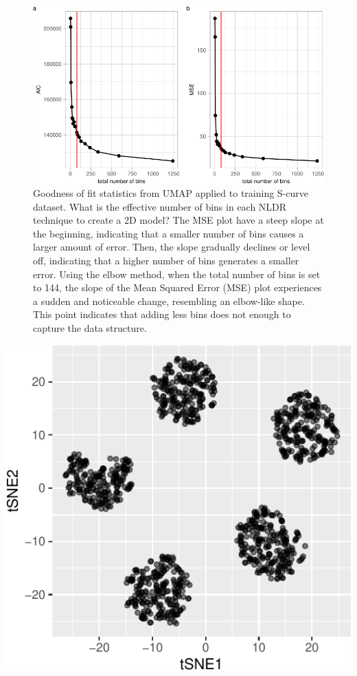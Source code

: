 \documentclass[
  12pt]{article}
\begin{document}
\begin{figure}

{\centering \includegraphics{paper_files/figure-pdf/fig-diagnosticpltPBMC-1.pdf}

}

\caption{\label{fig-diagnosticpltPBMC}Goodness of fit statistics from
UMAP applied to training S-curve dataset. What is the effective number
of bins in each NLDR technique to create a 2D model? The MSE plot have a
steep slope at the beginning, indicating that a smaller number of bins
causes a larger amount of error. Then, the slope gradually declines or
level off, indicating that a higher number of bins generates a smaller
error. Using the elbow method, when the total number of bins is set to
144, the slope of the Mean Squared Error (MSE) plot experiences a sudden
and noticeable change, resembling an elbow-like shape. This point
indicates that adding less bins does not enough to capture the data
structure.}

\end{figure}

\includegraphics{paper_files/figure-pdf/unnamed-chunk-55-1.pdf}
\end{document}
